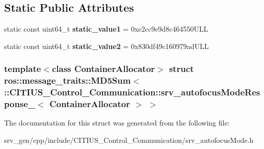\subsection*{\-Static \-Public \-Attributes}
\begin{DoxyCompactItemize}
\item 
\hypertarget{structros_1_1message__traits_1_1_m_d5_sum_3_01_1_1_c_i_t_i_u_s___control___communication_1_1srv_b6d78007e944a80cc28a20ebb8b4ceda_a3f970b45f2ba18d5d1fa1c92011db25a}{static const uint64\-\_\-t {\bfseries static\-\_\-value1} = 0xe2cc9e9d8c464550\-U\-L\-L}\label{structros_1_1message__traits_1_1_m_d5_sum_3_01_1_1_c_i_t_i_u_s___control___communication_1_1srv_b6d78007e944a80cc28a20ebb8b4ceda_a3f970b45f2ba18d5d1fa1c92011db25a}

\item 
\hypertarget{structros_1_1message__traits_1_1_m_d5_sum_3_01_1_1_c_i_t_i_u_s___control___communication_1_1srv_b6d78007e944a80cc28a20ebb8b4ceda_ad40a9647935bdb5eac06d04cbe3f612c}{static const uint64\-\_\-t {\bfseries static\-\_\-value2} = 0x830df49c160979ad\-U\-L\-L}\label{structros_1_1message__traits_1_1_m_d5_sum_3_01_1_1_c_i_t_i_u_s___control___communication_1_1srv_b6d78007e944a80cc28a20ebb8b4ceda_ad40a9647935bdb5eac06d04cbe3f612c}

\end{DoxyCompactItemize}
\subsubsection*{template$<$class Container\-Allocator$>$ struct ros\-::message\-\_\-traits\-::\-M\-D5\-Sum$<$ \-::\-C\-I\-T\-I\-U\-S\-\_\-\-Control\-\_\-\-Communication\-::srv\-\_\-autofocus\-Mode\-Response\-\_\-$<$ Container\-Allocator $>$ $>$}



\-The documentation for this struct was generated from the following file\-:\begin{DoxyCompactItemize}
\item 
srv\-\_\-gen/cpp/include/\-C\-I\-T\-I\-U\-S\-\_\-\-Control\-\_\-\-Communication/srv\-\_\-autofocus\-Mode.\-h\end{DoxyCompactItemize}
